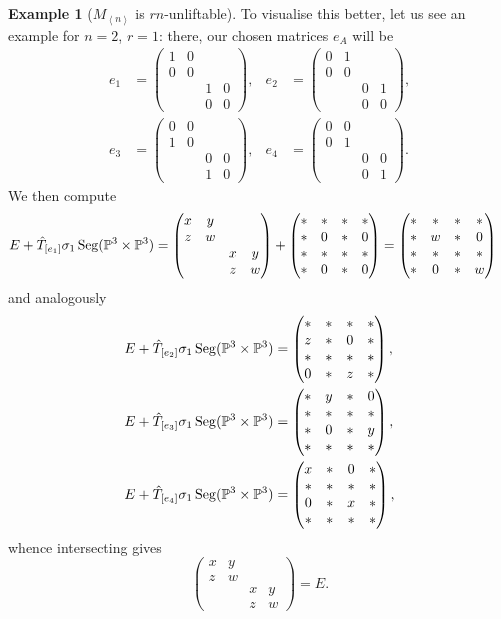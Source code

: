 \documentclass[a4paper,10pt]{article}
\def\gener#1{\left\langle#1\right\rangle}
\def\mtrx#1{\begin{pmatrix}#1\end{pmatrix}}
\DeclareMathOperator{\Seg}{Seg}
\theoremstyle{definition}
\newtheorem{example}[theorem]{Example}
\theoremstyle{remark}
\begin{document}
\begin{example}[$M_{\gener n}$ is $rn$-unliftable]
    To visualise this better, let us see an example for $n=2$, $r=1$: there, our chosen matrices $e_A$ will be
    \begin{align*}
        e_1 &= \mtrx{1&0&&\\0&0&&\\&&1&0\\&&0&0}, &
        e_2 &= \mtrx{0&1&&\\0&0&&\\&&0&1\\&&0&0}, \\
        e_3 &= \mtrx{0&0&&\\1&0&&\\&&0&0\\&&1&0}, &
        e_4 &= \mtrx{0&0&&\\0&1&&\\&&0&0\\&&0&1}.
    \end{align*}
    We then compute
    \begin{align*}
        E+\hat T_{[e_1]}\sigma_1\Seg(\pe^3\times\pe^3) &= \mtrx{x&y&&\\z&w&&\\&&x&y\\&&z&w} + \mtrx{*&*&*&*\\ *&0&*&0\\ *&*&*&*\\ *&0&*&0} = \mtrx{*&*&*&*\\ *&w&*&0\\ *&*&*&*\\ *&0&*&w}
    \end{align*}
    and analogously
    \begin{align*}
        E+\hat T_{[e_2]}\sigma_1\Seg(\pe^3\times\pe^3) &= \mtrx{
            *&*&*&*\\
            z&*&0&*\\
            *&*&*&*\\
            0&*&z&*
        },\\
        E+\hat T_{[e_3]}\sigma_1\Seg(\pe^3\times\pe^3) &= \mtrx{
            *&y&*&0\\
            *&*&*&*\\
            *&0&*&y\\
            *&*&*&*
        },\\
        E+\hat T_{[e_4]}\sigma_1\Seg(\pe^3\times\pe^3) &= \mtrx{
            x&*&0&*\\
            *&*&*&*\\
            0&*&x&*\\
            *&*&*&*
        },
    \end{align*}
    whence intersecting gives
    \[
    \mtrx{x&y&&\\z&w&&\\&&x&y\\&&z&w} = E.
    \]
\end{example}
\end{document}
